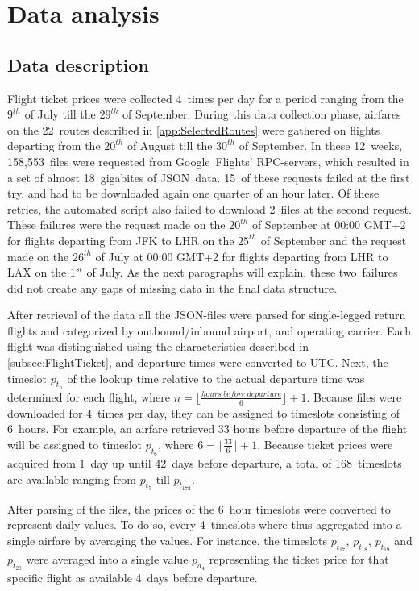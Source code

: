 \chapter{Data analysis}
\label{chap:DataAnalysis}
\section{Data description}
Flight ticket prices were collected 4~times per day for a period ranging from the $9^{th}$ of July till the $29^{th}$ of September. During this data collection phase, airfares on the 22~routes described in \autoref{app:SelectedRoutes} were gathered on flights departing from the $20^{th}$ of August till the $30^{th}$ of September. In these 12~weeks, 158,553~files were requested from Google~Flights' RPC-servers, which resulted in a set of almost 18~gigabites of JSON~data. 15~of these requests failed at the first try, and had to be downloaded again one quarter of an hour later. Of these retries, the automated script also failed to download 2~files at the second request. These failures were the request made on the $20^{th}$ of September at 00:00 GMT+2 for flights departing from JFK to LHR on the $25^{th}$ of September and the request made on the $26^{th}$ of July at 00:00 GMT+2 for flights departing from LHR to LAX on the $1^{st}$ of July. As the next paragraphs will explain, these two~failures did not create any gaps of missing data in the final data structure.

After retrieval of the data all the JSON-files were parsed for single-legged return flights and categorized by outbound/inbound airport, and operating carrier. Each flight was distinguished using the characteristics described in \autoref{subsec:FlightTicket}, and departure times were converted to UTC\@. Next, the timeslot $p_{t_n}$ of the lookup time relative to the actual departure time was determined for each flight, where $n = \lfloor \frac{\scriptstyle{hours\ before\ departure}}{6} \rfloor + 1$. Because files were downloaded for 4~times per day, they can be assigned to timeslots consisting of 6~hours. For example, an airfare retrieved 33 hours before departure of the flight will be assigned to timeslot $p_{t_6}$, where $6 = \lfloor \frac{33}{6} \rfloor + 1$. Because ticket prices were acquired from 1~day up until 42~days before departure, a total of 168~timeslots are available ranging from $p_{t_5}$ till $p_{t_{172}}$.

After parsing of the files, the prices of the 6~hour timeslots were converted to represent daily values. To do so, every 4~timeslots where thus aggregated into a single airfare by averaging the values. For instance, the timeslots $p_{t_{17}}$, $p_{t_{18}}$, $p_{t_{19}}$ and $p_{t_{20}}$ were averaged into a single value $p_{d_4}$ representing the ticket price for that specific flight as available 4~days before departure.

